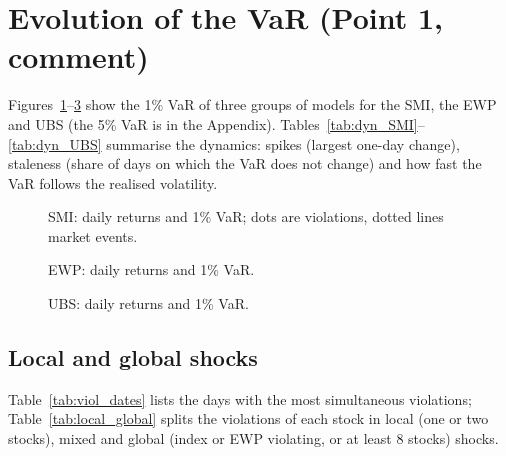 \section{Evolution of the VaR (Point 1, comment)}\label{sec:dynamics}

Figures~\ref{fig:var_SMI}--\ref{fig:var_UBS} show the 1\% VaR of three groups of models for the SMI, the EWP and
UBS (the 5\% VaR is in the Appendix). Tables~\ref{tab:dyn_SMI}--\ref{tab:dyn_UBS} summarise the dynamics: spikes
(largest one-day change), staleness (share of days on which the VaR does not change) and how fast the VaR follows
the realised volatility.

\begin{figure}[H]\centering
{}
\caption{SMI: daily returns and 1\% VaR; dots are violations, dotted lines market events.}\label{fig:var_SMI}
\end{figure}
\begin{figure}[H]\centering
{}
\caption{EWP: daily returns and 1\% VaR.}\label{fig:var_EWP}
\end{figure}
\begin{figure}[H]\centering
{}
\caption{UBS: daily returns and 1\% VaR.}\label{fig:var_UBS}
\end{figure}



\subsection{Local and global shocks}
Table~\ref{tab:viol_dates} lists the days with the most simultaneous violations; Table~\ref{tab:local_global} splits
the violations of each stock in local (one or two stocks), mixed and global (index or EWP violating, or at least 8
stocks) shocks.

